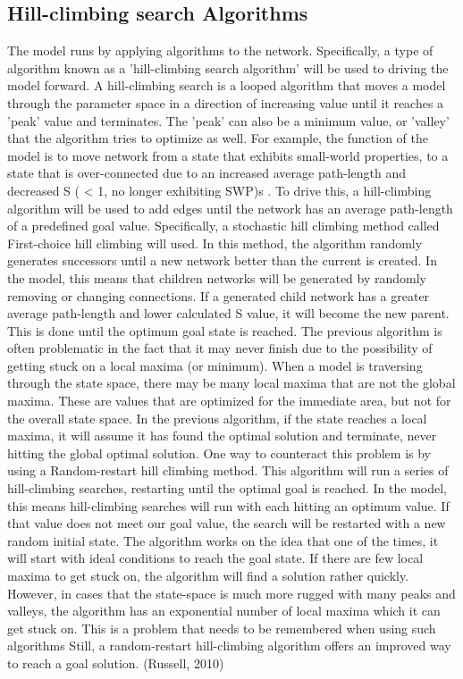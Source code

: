 \documentclass[12pt,letterpaper]{report}
\begin{document}
\subsection{Hill-climbing search Algorithms}
	The model runs by applying algorithms to the network. Specifically, a type of algorithm known as a 'hill-climbing search algorithm' will be used to driving the model forward. A hill-climbing search is a looped algorithm that moves a model through the parameter space in a direction of increasing value until it reaches a 'peak' value and terminates. The 'peak' can also be a minimum value, or 'valley' that the algorithm tries to optimize as well. For example, the function of the model is to move network from a state that exhibits small-world properties, to a state that is over-connected due to an increased average path-length and decreased S ( < 1, no longer exhibiting SWP)s . To drive this, a hill-climbing algorithm will be used to add edges until the network has an average path-length of a predefined goal value. Specifically, a stochastic hill climbing method called First-choice hill climbing will used. In this method, the algorithm randomly generates successors until a new network better than the current is created. In the model, this means that children networks will be generated by randomly removing or changing connections. If a generated child network has a greater average path-length and lower calculated S value, it will become the new parent. This is done until the optimum goal state is reached.
	The previous algorithm is often problematic in the fact that it may never finish due to the possibility of getting stuck on a local maxima (or minimum). When a model is traversing through the state space, there may be many local maxima that are not the global maxima. These are values that are optimized for the immediate area, but not for the overall state space. In the previous algorithm, if the state reaches a local maxima, it will assume it has found the optimal solution and terminate, never hitting the global optimal solution. One way to counteract this problem is by using a Random-restart hill climbing method. This algorithm will run a series of hill-climbing searches, restarting until the optimal goal is reached. In the model, this means hill-climbing searches will run with each hitting an optimum value. If that value does not meet our goal value, the search will be restarted with a new random initial state. The algorithm works on the idea that one of the times, it will start with ideal conditions to reach the goal state. If there are few local maxima to get stuck on, the algorithm will find a solution rather quickly. However, in cases that the state-space is much more rugged with many peaks and valleys,  the algorithm has an exponential number of local maxima which it can get stuck on. This is a problem that needs to be remembered when using such algorithms Still, a random-restart hill-climbing algorithm offers an improved way to reach a goal solution. (Russell, 2010)
\end{document}
